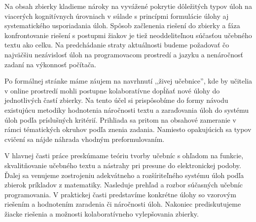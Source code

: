 Na obsah zbierky kladieme nároky na vyvážené pokrytie dôležitých typov úloh na viacerých kognitívnych úrovniach v súlade s princípmi formulácie úlohy aj systematického usporiadania úloh. Spôsob začlenenia riešení do zbierky a fáza konfrontovanie riešení s postupmi žiakov je tiež neoddeliteľnou súčasťou učebného textu ako celku. Na predchádanie straty aktuálnosti budeme požadovať čo najväčšiu nezávislosť úloh na programovacom prostredí a jazyku a nenáročnosť zadaní na výkonnosť počítača. 

Po formálnej stránke máme záujem na navrhnutí ,,živej učebnice'', kde by učitelia v online prostredí mohli postupne kolaboratívne dopĺňať nové úlohy do jednotlivých častí zbierky. Na tento účel si prispôsobíme do formy návodu existujúcu metodiky hodnotenia náročnosti textu a zaraďovania úloh do systému úloh podľa príslušných kritérií. Prihliada sa pritom na obsahové zameranie v rámci tématických okruhov podľa znenia zadania. Namiesto opakujúcich sa typov cvičení sa nájde náhrada vhodným preformulovaním.

V hlavnej časti práce preskúmame teóriu tvorby učebníc s ohľadom na funkcie, skvalitňovanie učebného textu a nástrahy pri presune do elektronickej podoby. Ďalej sa venujeme zostrojeniu adekvátneho a rozšíriteľného systému úloh podľa zbierok príkladov z matematiky. Nasleduje   prehľad a rozbor súčasných učebníc programovania. V praktickej časti predstavíme konkrétne úlohy so vzorovým riešením a hodnotením zaradenia či náročnosti úloh. Nakoniec prediskutujeme žiacke riešenia a možnosti kolaboratívneho vylepšovania zbierky.